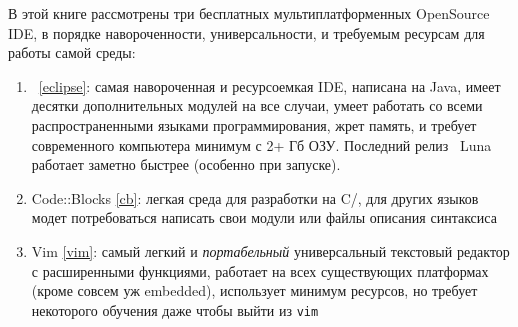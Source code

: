 В этой книге рассмотрены три бесплатных мультиплатформенных OpenSource IDE, в
порядке навороченности, универсальности, и требуемым ресурсам для работы самой
среды:

\begin{enumerate}
  \item \eclipse\ \ref{eclipse}: самая навороченная и ресурсоемкая IDE, написана
  на Java, имеет десятки дополнительных модулей на все случаи, умеет работать со
  всеми распространенными языками программирования, жрет память, и требует
  современного компьютера минимум с 2+ Гб ОЗУ. Последний релиз \eclipse\ Luna
  работает заметно быстрее (особенно при запуске). 
  \item Code::Blocks \ref{cb}: легкая среда для разработки на C/\cpp, для других
  языков модет потребоваться написать свои модули или файлы описания синтаксиса
  \item Vim \ref{vim}: самый легкий и \emph{портабельный} универсальный
  текстовый редактор с расширенными функциями, работает на всех
  существующих платформах (кроме совсем уж embedded), использует минимум
  ресурсов, но требует некоторого обучения даже чтобы выйти из \verb|vim|
  \smiley
\end{enumerate}




